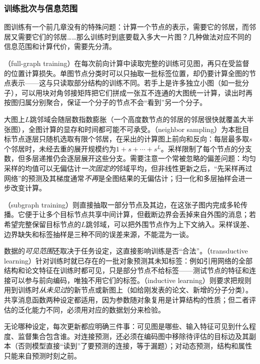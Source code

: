 \subsubsection{训练批次与信息范围}
\label{sec:gnn-training-batches}

图训练有一个前几章没有的特殊问题：计算一个节点的表示，需要它的邻居，而邻居又需要它们的邻居……那么训练时到底要载入多大一片图？几种做法对应不同的信息范围和计算代价，需要先分清。

（full-graph training）在每次前向计算中读取完整的训练可见图，再只在受监督的位置计算损失。单图节点分类时可以只抽取一批标签位置，却仍要计算全图的节点表示——这与只读取部分结构的训练不同。若手上是许多独立小图（如一批分子），可以用块对角邻接矩阵把它们拼成一张互不连通的大图统一计算，读出时再按图归属分别聚合，保证一个分子的节点不会“看到”另一个分子。

大图上$L$跳邻域会随层数指数膨胀（一个高度数节点的邻居的邻居很快就覆盖大半张图），全图计算的显存和时间都可能不可承受。（neighbor sampling）为本批目标节点逐层只随机选取有限个邻居，在采出的计算图上前向和反向：每层最多取$s$个邻居时，未经去重的展开规模约为$1+s+\cdots+s^L$。采样限制了每个节点的分支数，但多层递推仍会逐层展开这些分支。需要注意一个常被忽略的偏差问题：均匀采样的均值可以无偏估计\emph{一次固定的}邻域平均，但非线性更新之后，“先采样再过网络”的预测及其梯度通常\emph{不再}是全图结果的无偏估计；归一化和多层抽样会进一步改变计算。

（subgraph training）则直接抽取一部分节点及其边，在这张子图内完成多轮传播。它便于让多个目标节点共享中间计算，但截断边界会丢掉来自外围的消息；若希望完整保留目标节点的$L$跳邻域，可以把外围节点作为上下文纳入。采样误差、边界缺失和标签抽样是三种不同的误差来源，不能混为一谈。

数据的\emph{可见范围}还取决于任务设定，这直接影响训练是否“合法”。（transductive learning）针对训练时就已存在的一批对象预测其未知标签：例如引用网络的全部结构和论文特征在训练时都可见，只是部分节点不给标签——测试节点的特征和连接可以参与前向编码，唯独不用它们的标签。（inductive learning）则要求把规则用到训练时\emph{从未见过}的新节点或新图上（如给刚发表的论文、新增的分子分类）。共享消息函数两种设定都适用，因为参数随对象复用是计算结构的性质；但二者评估的泛化能力不同，必须用对应的数据划分来检验。

无论哪种设定，每次更新都应明确三件事：可见图是哪些、输入特征可见到什么程度、监督集合包含谁。对连接预测，还必须在编码图中移除待评估的目标边及其副本（否则模型直接“读到”了要预测的连接，等于漏题）；对动态预测，结构和属性只能来自预测时刻之前。

